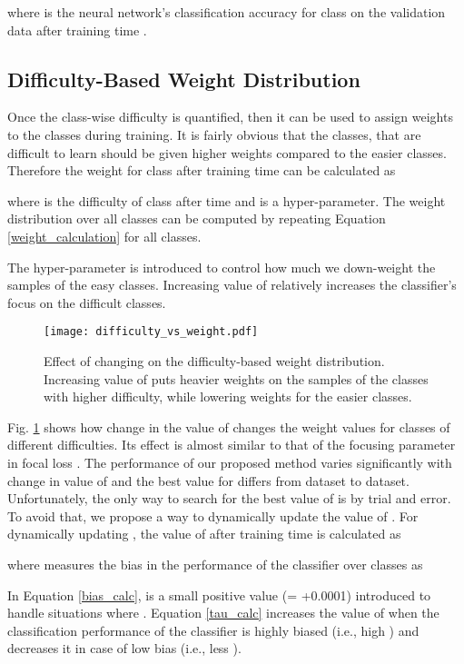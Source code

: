 \documentclass[runningheads]{llncs}
\begin{document}
where 
is the neural network’s classification accuracy for class  on the validation
data after training time .
\subsection{Difficulty-Based Weight Distribution}

Once the class-wise difficulty is quantified, then it can be used to assign 
weights
to the classes during training. It is fairly obvious that the classes, that are 
difficult to
learn should be given higher weights compared to the easier classes. Therefore 
the
weight for class  after training time  can be calculated as

where  
is the difficulty of class  after time  and  is a hyper-parameter. 
The
weight distribution  over all  classes can be computed by
repeating Equation \ref{weight_calculation} for all classes.

The hyper-parameter  is introduced to control how much we down-weight the
samples of the easy classes. Increasing value of  relatively increases the 
classifier’s
focus on the difficult classes. 
\begin{figure}[t]
\centering
\texttt{[image: difficulty\_vs\_weight.pdf]}
\caption{
Effect of changing  on the difficulty-based weight distribution. Increasing value of
 puts heavier weights on the samples of the classes with higher difficulty, while lowering
weights for the easier classes.
}
\label{fig:difficulty_vs_weight}
\end{figure}

Fig. \ref{fig:difficulty_vs_weight} shows how change in the value of  
changes the
weight values for classes of different difficulties. Its effect is almost 
similar to that of the focusing parameter  in focal loss \cite{FOCALloss}. The 
performance of our
proposed method varies significantly with change in value of  and the best 
value
for  differs from dataset to dataset. Unfortunately, the only way to 
search for the
best value of  is by trial and error. To avoid that, we propose a way to 
dynamically
update the value of . For dynamically updating , the value of  
after training time 
is calculated as

where  measures the bias in the performance of the classifier over  
classes as

In Equation \ref{bias_calc},  is a small positive value (= +0.0001) 
introduced to handle situations
where . Equation \ref{tau_calc} increases 
the value of  when the classification performance of the classifier is 
highly biased (i.e., high ) and decreases it in
case of low bias (i.e., less ).
\end{document}
